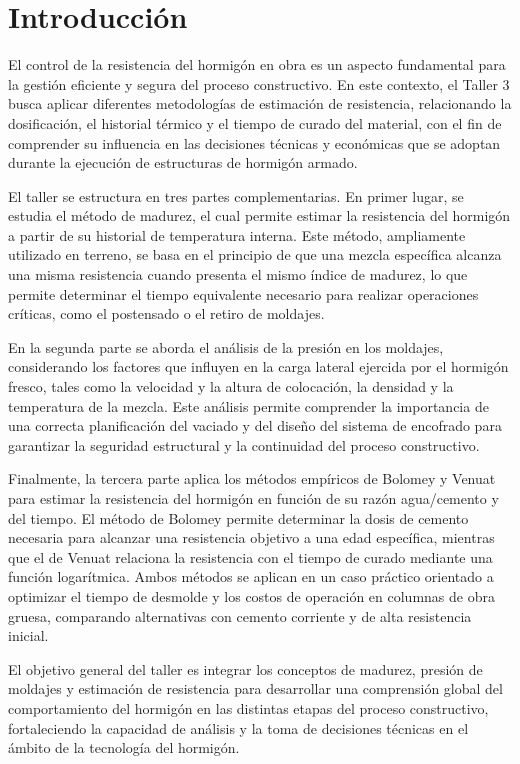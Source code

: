 \section{Introducción}

El control de la resistencia del hormigón en obra es un aspecto fundamental para la gestión eficiente y segura del proceso constructivo. En este contexto, el Taller 3 busca aplicar diferentes metodologías de estimación de resistencia, relacionando la dosificación, el historial térmico y el tiempo de curado del material, con el fin de comprender su influencia en las decisiones técnicas y económicas que se adoptan durante la ejecución de estructuras de hormigón armado.

El taller se estructura en tres partes complementarias. En primer lugar, se estudia el método de madurez, el cual permite estimar la resistencia del hormigón a partir de su historial de temperatura interna. Este método, ampliamente utilizado en terreno, se basa en el principio de que una mezcla específica alcanza una misma resistencia cuando presenta el mismo índice de madurez, lo que permite determinar el tiempo equivalente necesario para realizar operaciones críticas, como el postensado o el retiro de moldajes.

En la segunda parte se aborda el análisis de la presión en los moldajes, considerando los factores que influyen en la carga lateral ejercida por el hormigón fresco, tales como la velocidad y la altura de colocación, la densidad y la temperatura de la mezcla. Este análisis permite comprender la importancia de una correcta planificación del vaciado y del diseño del sistema de encofrado para garantizar la seguridad estructural y la continuidad del proceso constructivo.

Finalmente, la tercera parte aplica los métodos empíricos de Bolomey y Venuat para estimar la resistencia del hormigón en función de su razón agua/cemento y del tiempo. El método de Bolomey permite determinar la dosis de cemento necesaria para alcanzar una resistencia objetivo a una edad específica, mientras que el de Venuat relaciona la resistencia con el tiempo de curado mediante una función logarítmica. Ambos métodos se aplican en un caso práctico orientado a optimizar el tiempo de desmolde y los costos de operación en columnas de obra gruesa, comparando alternativas con cemento corriente y de alta resistencia inicial.

El objetivo general del taller es integrar los conceptos de madurez, presión de moldajes y estimación de resistencia para desarrollar una comprensión global del comportamiento del hormigón en las distintas etapas del proceso constructivo, fortaleciendo la capacidad de análisis y la toma de decisiones técnicas en el ámbito de la tecnología del hormigón.
